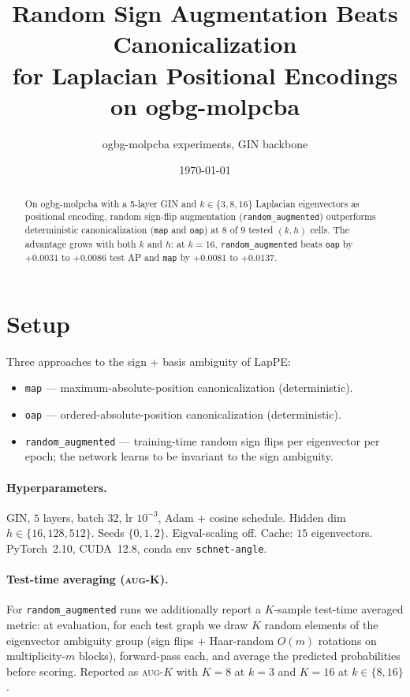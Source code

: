 \documentclass[11pt]{article}
\title{Random Sign Augmentation Beats Canonicalization\\
       for Laplacian Positional Encodings on ogbg-molpcba}
\author{ogbg-molpcba experiments, GIN backbone}
\date{\today}
\begin{document}
\maketitle

\begin{abstract}
On ogbg-molpcba with a 5-layer GIN and $k\!\in\!\{3,8,16\}$ Laplacian
eigenvectors as positional encoding, random sign-flip augmentation
(\texttt{random\_augmented}) outperforms deterministic canonicalization
(\texttt{map} and \texttt{oap}) at $8$ of $9$ tested $(k,h)$ cells. The
advantage grows with both $k$ and $h$: at $k\!=\!16$,
\texttt{random\_augmented} beats \texttt{oap} by $+0.0031$ to $+0.0086$
test AP and \texttt{map} by $+0.0081$ to $+0.0137$.
\end{abstract}

\section{Setup}

Three approaches to the sign + basis ambiguity of LapPE:
\begin{itemize}\itemsep0pt
\item \texttt{map} --- maximum-absolute-position canonicalization (deterministic).
\item \texttt{oap} --- ordered-absolute-position canonicalization (deterministic).
\item \texttt{random\_augmented} --- training-time random sign flips per
      eigenvector per epoch; the network learns to be invariant to the
      sign ambiguity.
\end{itemize}

\paragraph{Hyperparameters.} GIN, $5$ layers, batch $32$, lr $10^{-3}$,
Adam + cosine schedule. Hidden dim $h\!\in\!\{16, 128, 512\}$. Seeds
$\{0,1,2\}$. Eigval-scaling off. Cache: $15$ eigenvectors. PyTorch~2.10,
CUDA~12.8, conda env \texttt{schnet-angle}.

\paragraph{Test-time averaging (\textsc{aug-K}).} For
\texttt{random\_augmented} runs we additionally report a $K$-sample
test-time averaged metric: at evaluation, for each test graph we draw
$K$ random elements of the eigenvector ambiguity group (sign flips +
Haar-random $O(m)$ rotations on multiplicity-$m$ blocks), forward-pass
each, and average the predicted probabilities before scoring. Reported
as \textsc{aug-$K$} with $K\!=\!8$ at $k\!=\!3$ and $K\!=\!16$ at
$k\!\in\!\{8,16\}$.
\end{document}

